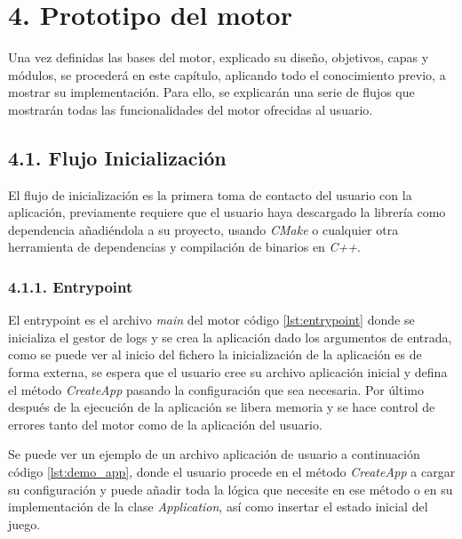 \chapter*{4. Prototipo del motor}\label{cap:prototype}

Una vez definidas las bases del motor, explicado su diseño, objetivos, capas y módulos, se procederá en este 
capítulo, aplicando todo el conocimiento previo, a mostrar su implementación. Para ello, se explicarán una serie
de flujos que mostrarán todas las funcionalidades del motor ofrecidas al usuario.

\section*{4.1. Flujo Inicialización}\label{sec:workflow_init}

El flujo de inicialización es la primera toma de contacto del usuario con la aplicación, previamente requiere que el usuario
haya descargado la librería como dependencia añadiéndola a su proyecto, usando \textit{CMake}\cite{cmake-tutorial} o cualquier otra
herramienta de dependencias y compilación de binarios en \textit{C++}.

\subsection*{4.1.1. Entrypoint}\label{sec:workflow_init_entrypoint}
El entrypoint es el archivo \textit{main} del motor código \ref{lst:entrypoint} donde se inicializa el gestor de logs
y se crea la aplicación dado los argumentos de entrada, como se puede ver al inicio del fichero la inicialización de la aplicación es de forma externa, se espera
que el usuario cree su archivo aplicación inicial y defina el método \textit{CreateApp} pasando la configuración que sea
necesaria. Por último después de la ejecución de la aplicación se libera memoria y se hace control de errores tanto del motor
como de la aplicación del usuario.

\newpage

Se puede ver un ejemplo de un archivo aplicación de usuario a continuación código \ref{lst:demo_app}, donde
el usuario procede en el método \textit{CreateApp} a cargar su configuración y puede añadir toda la lógica que necesite
en ese método o en su implementación de la clase \textit{Application}, así como insertar el estado inicial del juego.
\newpage


